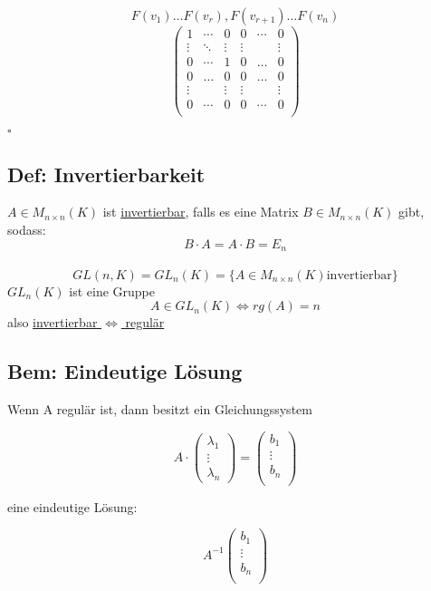 \documentclass[titlepage,12pt,a4paper,ngerman]{report}
\begin{document}
$$F(v_1) \dots F(v_r), F(v_{r+1}) \dots F(v_n)$$ 
\nopagebreak
$$\begin{pmatrix}
1   &\cdots  & 0  &   0 & \cdots & 0 \\
\vdots   &\ddots & \vdots  & \vdots && \vdots\\
0 & \cdots  &1 &  0 & \dots & 0 \\
0 & \dots & 0 & 0 & \dots & 0 \\
\vdots  & & \vdots & \vdots & & \vdots\\
0&\cdots &0 & 0&\cdots & 0\\
\end{pmatrix} $$

\begin{flushright}
	$\square$
\end{flushright}

\subsection{Def: Invertierbarkeit}
$A \in M_{n\times n} (K) $ ist \underline{invertierbar}, falls es eine Matrix $B\in M_{n\times n} (K)$ gibt, sodass: $$B\cdot A = A\cdot B = E_n$$\\
$$GL(n,K)= GL_n(K) = \{A\in M_{n\times n} (K) \textrm{invertierbar}\}$$
$GL_n(K)$ ist eine Gruppe\\
$$A\in GL_n(K) \Leftrightarrow rg(A) = n$$
also \underline{invertierbar $\Leftrightarrow$ regulär}\\

\subsection{Bem: Eindeutige Lösung}
Wenn A regulär ist, dann besitzt ein Gleichungssystem

$$A \cdot \begin{pmatrix}
\lambda_1\\
\vdots\\
\lambda_n
\end{pmatrix} 
= \begin{pmatrix}
b_1\\
\vdots\\
b_n\\
\end{pmatrix}$$

eine eindeutige Lösung:

$$A^{-1} \begin{pmatrix}
b_1\\
\vdots\\
b_n\\
\end{pmatrix}$$
\end{document}
